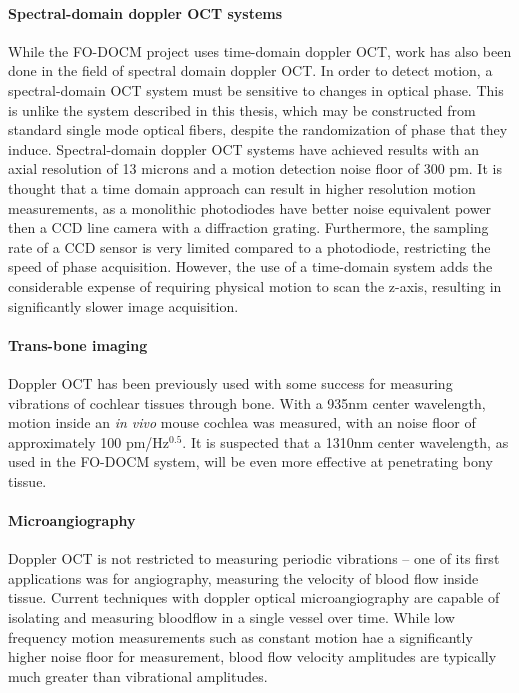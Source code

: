 \paragraph{Spectral-domain doppler OCT systems} While the FO-DOCM project uses time-domain doppler OCT, work has also been done in the field of spectral domain doppler OCT.  In order to detect motion, a spectral-domain OCT system must be sensitive to changes in optical phase. This is unlike the system described in this thesis, which may be constructed from standard single mode optical fibers, despite the randomization of phase that they induce. Spectral-domain doppler OCT systems have achieved results with an axial resolution of 13 microns and a motion detection noise floor of 300 pm. It is thought that a time domain approach can result in higher resolution motion measurements, as a monolithic photodiodes have better noise equivalent power then a CCD line camera with a diffraction grating. Furthermore, the sampling rate of a CCD sensor is very limited compared to a photodiode, restricting the speed of phase acquisition. However, the use of a time-domain system adds the considerable expense of requiring physical motion to scan the z-axis, resulting in significantly slower image acquisition. \cite{Choudhury2011} \cite{Subhash2012}

\paragraph{Trans-bone imaging} Doppler OCT has been previously used with some success for measuring vibrations of cochlear tissues through bone. With a 935nm center wavelength, motion inside an {\em in vivo} mouse cochlea was measured, with an noise floor of approximately 100 pm/Hz$^{0.5}$. \cite{Gao2013} It is suspected that a 1310nm center wavelength, as used in the FO-DOCM system, will be even more effective at penetrating bony tissue. \cite{Sandell2011} \cite{Bashkatov2006}

\paragraph{Microangiography} Doppler OCT is not restricted to measuring periodic vibrations -- one of its first applications was for angiography, measuring the velocity of blood flow inside tissue. Current techniques with doppler optical microangiography are capable of isolating and measuring bloodflow in a single vessel over time. While low frequency motion measurements such as constant motion hae a significantly higher noise floor for measurement, blood flow velocity amplitudes are typically much greater than vibrational amplitudes. \cite{Dziennis2012}

